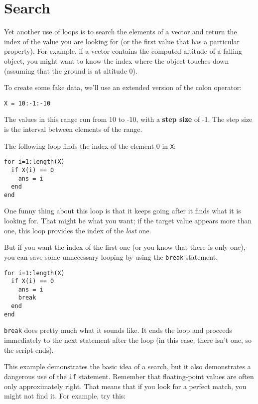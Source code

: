\section{Search}
\label{search}

Yet another use of loops is to search the elements of a vector
and return the index of the value you are looking for (or the
first value that has a particular property). For example, if
a vector contains the computed altitude of a falling object, you
might want to know the index where the object touches down (assuming
that the ground is at altitude 0).

To create some fake data, we'll use an extended version of the
colon operator:

\begin{verbatim}
X = 10:-1:-10
\end{verbatim}

The values in this range run from 10 to -10, with a {\bf step size}
of -1. The step size is the interval between elements of the range.

The following loop finds the index of the element 0 in {\tt X}:

\begin{verbatim}
for i=1:length(X)
  if X(i) == 0
    ans = i
  end
end
\end{verbatim}
 
One funny thing about this loop is that it keeps going after it
finds what it is looking for. That might be what you want; if the
target value appears more than one, this loop provides the index
of the {\em last} one.

But if you want the index of the first one (or you know that there
is only one), you can save some unnecessary looping by using the
{\tt break} statement.

\begin{verbatim}
for i=1:length(X)
  if X(i) == 0
    ans = i
    break
  end
end
\end{verbatim}

{\tt break} does pretty much what it sounds like. It ends the
loop and proceeds immediately to the next statement after the
loop (in this case, there isn't one, so the script ends).

This example demonstrates the basic idea of a search, but it
also demonstrates a dangerous use of the {\tt if} statement.
Remember that floating-point values are often only approximately
right. That means that if you look for a perfect match, you might
not find it. For example, try this:

